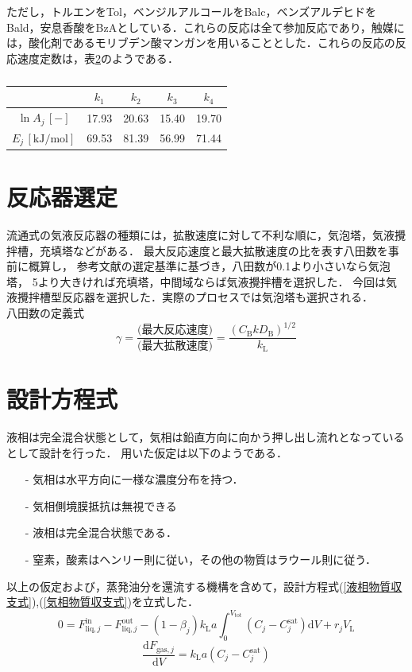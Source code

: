 \documentclass[a4j]{jsreport}
\newcommand{\diff}{\mathrm{d}}
\begin{document}
ただし，トルエンをTol，ベンジルアルコールをBalc，ベンズアルデヒドをBald，安息香酸をBzAとしている．これらの反応は全て参加反応であり，触媒には，酸化剤であるモリブデン酸マンガンを用いることとした．これらの反応の反応速度定数は，表\ref{}のようである\cite{}．
\begin{table}
  \centering
  \label{}
  \caption{}
  \begin{tabular}{ccccc}
    \hline
    & $k_1$ & $k_2$ & $k_3$ & $k_4$ \\
    \hline
    $\ln A_j \, [\si{-}]$ & 17.93 & 20.63 & 15.40 & 19.70 \\
    $E_j \, [\si{\kilo \joule \per \mole}]$ & 69.53 & 81.39 & 56.99 & 71.44 \\
    \hline
  \end{tabular}
\end{table}

\section{反応器選定}
流通式の気液反応器の種類には，拡散速度に対して不利な順に，気泡塔，気液攪拌槽，充填塔などがある．
最大反応速度と最大拡散速度の比を表す八田数を事前に概算し，
参考文献\cite{化工便覧}の選定基準に基づき，八田数が0.1より小さいなら気泡塔，
5より大きければ充填塔，中間域ならば気液攪拌槽を選択した．
今回は気液攪拌槽型反応器を選択した．実際のプロセスでは気泡塔も選択される．\\
八田数の定義式
\begin{equation}
    \gamma = \frac{\text{(最大反応速度)}}{\text{(最大拡散速度)}} = \frac{(C_\mathrm{B}kD_\mathrm{B})^{1/2}} {k_\mathrm{L}}
\end{equation}

\section{設計方程式}
液相は完全混合状態として，気相は鉛直方向に向かう押し出し流れとなっているとして設計を行った．
用いた仮定は以下のようである．
\begin{itemize}
    \item[-] 気相は水平方向に一様な濃度分布を持つ．
    \item[-] 気相側境膜抵抗は無視できる
    \item[-] 液相は完全混合状態である．
    \item[-] 窒素，酸素はヘンリー則に従い，その他の物質はラウール則に従う．
\end{itemize}
以上の仮定および，蒸発油分を還流する機構を含めて，設計方程式(\ref{液相物質収支式}),(\ref{気相物質収支式})を立式した．\\
\begin{equation}
    \label{液相物質収支式}
    0 = F^\text{in}_{\text{liq},j} - F^\text{out}_{\text{liq},j} - (1-\beta_j) k_\mathrm{L}a
    \int^{V_\text{tot}}_0(C_j - C^\text{sat}_j) \diff V + r_j V_\mathrm{L}
\end{equation}
\begin{equation}
    \label{気相物質収支式}
    \frac{ \diff F_{\text{gas},j}}{\diff V} = k_\mathrm{L}a (C_j - C^\text{sat}_j)
\end{equation}
\end{document}
